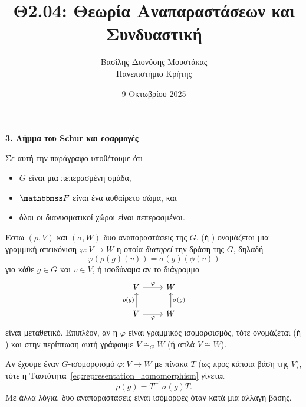 \documentclass[12pt,a4paper,reqno]{amsart}
\title{Θ2.04: Θεωρία Αναπαραστάσεων και Συνδυαστική}
\author[Β.~Δ. Μουστακας]{Βασίλης Διονύσης Μουστάκας \\ Πανεπιστήμιο Κρήτης}
\date{9 Οκτωβρίου 2025}
\newcommand{\defn}[1]{{\color{mylightblue}{#1}}}
\begin{document}
\begingroup
\def\uppercasenonmath#1{} %
\let\MakeUppercase\relax %
\maketitle
\endgroup

\setcounter{section}{3}
\thispagestyle{empty}

\begin{center}
    \textbf{3. Λήμμα του Schur και εφαρμογές
}
\end{center}

Σε αυτή την παράγραφο υποθέτουμε ότι
\begin{itemize}
    \item $G$ είναι μια πεπερασμένη ομάδα,
    \item $\FF$ είναι ένα αυθαίρετο σώμα, και
    \item όλοι οι διανυσματικοί χώροι είναι πεπερασμένοι.
\end{itemize}  

\begin{definition}
    \label{def:representation_homomorphism}
    Έστω $(\rho, V)$ και $(\sigma, W)$ δυο αναπαραστάσεις της $G$. \defn{Ομομορφισμός αναπαραστάσεων} (ή \defn{$G$-ομομορφισμός}) ονομάζεται μια γραμμική απεικόνιση $\varphi : V \to W$ η οποία \emph{διατηρεί} την δράση της $G$, δηλαδή 
    \begin{equation}
        \label{eq:representation_homomorphism}
        \varphi(\rho(g)(v)) = \sigma(g)(\phi(v))
    \end{equation}
    για κάθε $g \in G$ και $v \in V$, ή ισοδύναμα αν το διάγραμμα
    \[
    \begin{tikzcd}
    V \arrow[r, "\varphi"] & W \\
    V \arrow[r, "\varphi"'] \arrow[u, "\rho(g)"] & W \arrow[u, "\sigma(g)"', right]
    \end{tikzcd}
    \]
    είναι μεταθετικό. Επιπλέον, αν η $\varphi$ είναι γραμμικός ισομορφισμός, τότε ονομάζεται \defn{ισομορφισμός αναπαραστάσεων} (ή \defn{$G$-ισομορφισμός}) και στην περίπτωση αυτή γράφουμε $V \cong_G W$ (ή απλά $V\cong W$).
\end{definition}

Αν έχουμε έναν $G$-ισομορφισμό $\varphi : V \to W$ με πίνακα $T$ (ως προς κάποια βάση της $V$), τότε η Ταυτότητα~\eqref{eq:representation_homomorphism} γίνεται
\[
\rho(g) = T^{-1}\sigma(g)T.
\]
Με άλλα λόγια, δυο αναπαραστάσεις είναι ισόμορφες όταν  κατά μια αλλαγή βάσης. 
\end{document}
